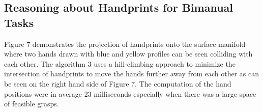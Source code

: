 \documentclass[a4paper,10pt,twocolumn]{article}
\begin{document}
\subsection{Reasoning about Handprints for Bimanual Tasks}

Figure 7 demonstrates the projection of handprints onto the surface manifold where two hands
drawn with blue and yellow profiles can be seen colliding with each other. The algorithm 3
uses a hill-climbing approach to minimize the intersection of handprints to move the hands
further away from each other as can be seen on the right hand side of Figure 7. The computation of the hand positions were in average 23 milliseconds especially when there was a large space of feasible grasps.
\end{document}
